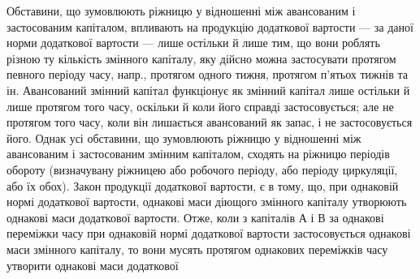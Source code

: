 \vtyagnut{}
Обставини, що зумовлюють ріжницю у відношенні між авансованим і
застосованим капіталом, впливають на продукцію додаткової вартости —
за даної норми додаткової вартости — лише остільки й лише тим, що
вони роблять різною ту кількість змінного капіталу, яку дійсно можна
застосувати протягом певного періоду часу, напр., протягом одного тижня,
протягом п’ятьох тижнів та ін. Авансований змінний капітал функціонує
як змінний капітал лише остільки й лише протягом того часу, оскільки й
коли його справді застосовується; але не протягом того часу, коли він
лишається авансований як запас, і не застосовується його. Однак усі
обставини, що зумовлюють ріжницю у відношенні між авансованим і застосованим
змінним капіталом, сходять на ріжницю періодів обороту
(визначувану ріжницею або робочого періоду, або періоду циркуляції,
або їх обох). Закон продукції додаткової вартости, є в тому, що, при однаковій
нормі додаткової вартости, однакові маси діющого змінного капіталу
утворюють однакові маси додаткової вартости. Отже, коли з капіталів
$А$ і $В$ за однакові переміжки часу при однаковій нормі додаткової
вартости застосовується однакові маси змінного капіталу, то вони мусять
протягом однакових переміжків часу утворити однакові маси додаткової
\parbreak{}  %
